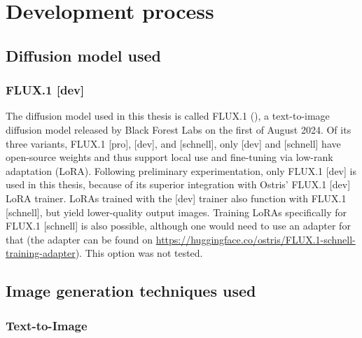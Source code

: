 \chapter{Development process}

\section{Diffusion model used} \label{sec:Models used}
\subsection{FLUX.1 [dev]}
The diffusion model used in this thesis is called FLUX.1 (\cite{black_forest_labs_announcing_2024}), a text-to-image diffusion model released by Black Forest Labs on the first of August 2024. Of its three variants, FLUX.1 [pro], [dev], and [schnell], only [dev] and [schnell] have open-source weights and thus support local use and fine-tuning via low-rank adaptation (LoRA).
Following preliminary experimentation, only FLUX.1 [dev] is used in this thesis, because of its superior integration with Ostris' FLUX.1 [dev] LoRA trainer. LoRAs trained with the [dev] trainer also function with FLUX.1 [schnell], but yield lower-quality output images. Training LoRAs specifically for FLUX.1 [schnell] is also possible, although one would need to use an adapter for that (the adapter can be found on \href{https://huggingface.co/ostris/FLUX.1-schnell-training-adapter}{https://huggingface.co/ostris/FLUX.1-schnell-training-adapter}). This option was not tested.
\section{Image generation techniques used}
\subsection{Text-to-Image}

